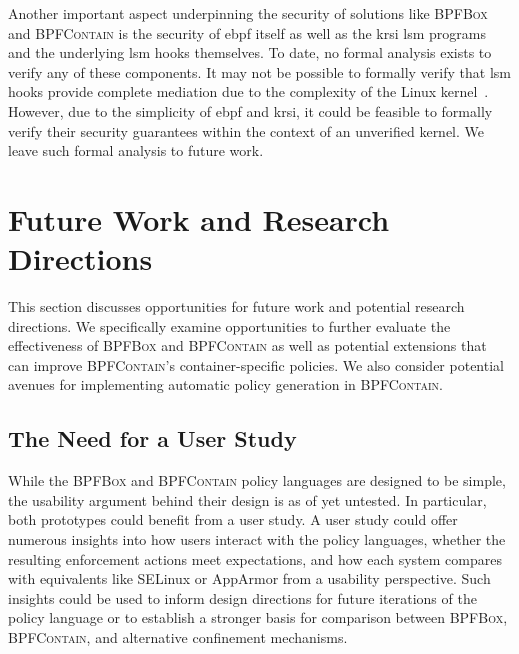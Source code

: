 \documentclass[
  fontsize=12pt,
  titlepage=firstiscover,
  paper=letter,
oneside,
  cleardoublepage=plain,
  parskip=half-,
  DIV=10,
  parindent,
  appendixprefix,
  chapterprefix,
  listof=totoc,
]{scrbook}
\newcommand{\bpfbox}{\textsc{BPFBox}}
\newcommand{\bpfcontain}{\textsc{BPFContain}}
\begin{document}
Another important aspect underpinning the security of solutions like \bpfbox{} and
\bpfcontain{} is the security of \gls{ebpf} itself as well as the \gls{krsi} \gls{lsm}
programs and the underlying \gls{lsm} hooks themselves. To date, no formal analysis exists
to verify any of these components. It may not be possible to formally verify that
\gls{lsm} hooks provide complete mediation due to the complexity of the Linux
kernel~\cite{jaeger2008_os_security}. However, due to the simplicity of \gls{ebpf} and
\gls{krsi}, it could be feasible to formally verify their security guarantees within the
context of an unverified kernel. We leave such formal analysis to future
work.




\section{Future Work and Research Directions}\label{s:disc-future-work}

This section discusses opportunities for future work and potential research directions.
We specifically examine opportunities to further evaluate the effectiveness of \bpfbox{}
and \bpfcontain{} as well as potential extensions that can improve \bpfcontain{}'s
container-specific policies. We also consider potential avenues for implementing automatic
policy generation in \bpfcontain{}.


\subsection{The Need for a User Study}
\label{ss:disc-user-study}

While the \bpfbox{} and \bpfcontain{} policy languages are designed to be simple, the
usability argument behind their design is as of yet untested. In particular, both
prototypes could benefit from a user study. A user study could offer numerous insights
into how users interact with the policy languages, whether the resulting enforcement
actions meet expectations, and how each system compares with equivalents like SELinux or
AppArmor from a usability perspective. Such insights could be used to inform design
directions for future iterations of the policy language or to establish a stronger basis
for comparison between \bpfbox{}, \bpfcontain{}, and alternative confinement mechanisms.
\end{document}
